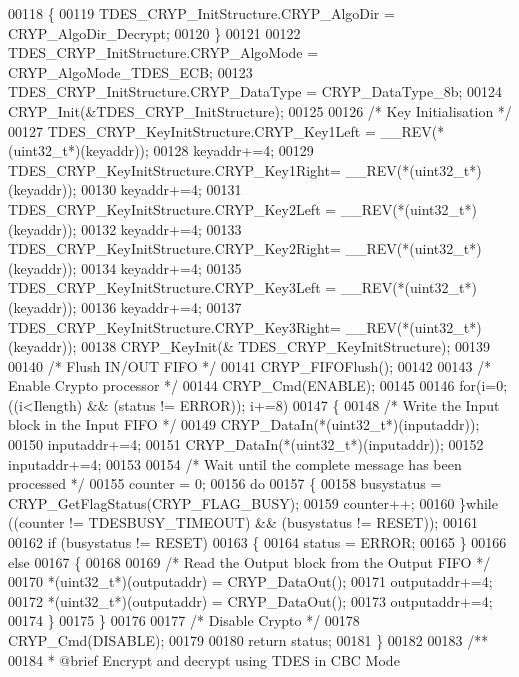 \begin{DoxyCode}
00118   \{
00119      TDES\_CRYP\_InitStructure.CRYP_AlgoDir = CRYP_AlgoDir_Decrypt;
00120   \}
00121 
00122   TDES\_CRYP\_InitStructure.CRYP_AlgoMode = CRYP_AlgoMode_TDES_ECB;
00123   TDES\_CRYP\_InitStructure.CRYP_DataType = CRYP_DataType_8b;
00124   CRYP_Init(&TDES\_CRYP\_InitStructure);
00125 
00126   \textcolor{comment}{/* Key Initialisation */}
00127   TDES\_CRYP\_KeyInitStructure.CRYP\_Key1Left = \_\_REV(*(uint32\_t*)(keyaddr));
00128   keyaddr+=4;
00129   TDES\_CRYP\_KeyInitStructure.CRYP\_Key1Right= \_\_REV(*(uint32\_t*)(keyaddr));
00130   keyaddr+=4;
00131   TDES\_CRYP\_KeyInitStructure.CRYP\_Key2Left = \_\_REV(*(uint32\_t*)(keyaddr));
00132   keyaddr+=4;
00133   TDES\_CRYP\_KeyInitStructure.CRYP\_Key2Right= \_\_REV(*(uint32\_t*)(keyaddr));
00134   keyaddr+=4;
00135   TDES\_CRYP\_KeyInitStructure.CRYP\_Key3Left = \_\_REV(*(uint32\_t*)(keyaddr));
00136   keyaddr+=4;
00137   TDES\_CRYP\_KeyInitStructure.CRYP\_Key3Right= \_\_REV(*(uint32\_t*)(keyaddr));
00138   CRYP_KeyInit(& TDES\_CRYP\_KeyInitStructure);
00139 
00140   \textcolor{comment}{/* Flush IN/OUT FIFO */}
00141   CRYP_FIFOFlush();
00142 
00143   \textcolor{comment}{/* Enable Crypto processor */}
00144   CRYP_Cmd(ENABLE);
00145 
00146   \textcolor{keywordflow}{for}(i=0; ((i<Ilength) && (status != ERROR)); i+=8)
00147   \{
00148     \textcolor{comment}{/* Write the Input block in the Input FIFO */}
00149     CRYP\_DataIn(*(uint32\_t*)(inputaddr));
00150     inputaddr+=4;
00151     CRYP\_DataIn(*(uint32\_t*)(inputaddr));
00152     inputaddr+=4;
00153 
00154     \textcolor{comment}{/* Wait until the complete message has been processed */}
00155     counter = 0;
00156     \textcolor{keywordflow}{do}
00157     \{
00158       busystatus = CRYP\_GetFlagStatus(CRYP_FLAG_BUSY);
00159       counter++;
00160     \}\textcolor{keywordflow}{while} ((counter != TDESBUSY_TIMEOUT) && (busystatus != RESET));
00161 
00162     \textcolor{keywordflow}{if} (busystatus != RESET)
00163     \{
00164        status = ERROR;
00165     \}
00166     \textcolor{keywordflow}{else}
00167     \{
00168 
00169       \textcolor{comment}{/* Read the Output block from the Output FIFO */}
00170       *(uint32\_t*)(outputaddr) = CRYP\_DataOut();
00171       outputaddr+=4;
00172       *(uint32\_t*)(outputaddr) = CRYP\_DataOut();
00173       outputaddr+=4;
00174     \}
00175   \}
00176 
00177   \textcolor{comment}{/* Disable Crypto */}
00178   CRYP_Cmd(DISABLE);
00179 
00180   \textcolor{keywordflow}{return} status;
00181 \}
00182 
00183 \textcolor{comment}{/**}
00184 \textcolor{comment}{  * @brief  Encrypt and decrypt using TDES in CBC Mode}

\end{DoxyCode}
